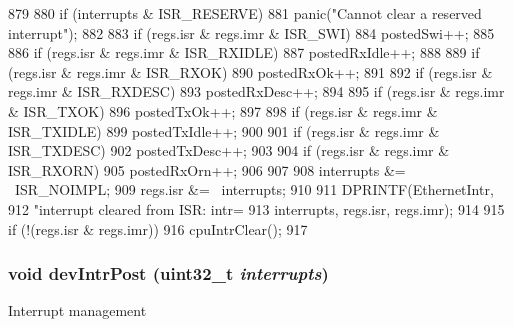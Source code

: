 \begin{DoxyCode}
879 {
880     if (interrupts & ISR_RESERVE)
881         panic("Cannot clear a reserved interrupt");
882 
883     if (regs.isr & regs.imr & ISR_SWI) {
884         postedSwi++;
885     }
886     if (regs.isr & regs.imr & ISR_RXIDLE) {
887         postedRxIdle++;
888     }
889     if (regs.isr & regs.imr & ISR_RXOK) {
890         postedRxOk++;
891     }
892     if (regs.isr & regs.imr & ISR_RXDESC) {
893             postedRxDesc++;
894     }
895     if (regs.isr & regs.imr & ISR_TXOK) {
896         postedTxOk++;
897     }
898     if (regs.isr & regs.imr & ISR_TXIDLE) {
899         postedTxIdle++;
900     }
901     if (regs.isr & regs.imr & ISR_TXDESC) {
902         postedTxDesc++;
903     }
904     if (regs.isr & regs.imr & ISR_RXORN) {
905         postedRxOrn++;
906     }
907 
908     interrupts &= ~ISR_NOIMPL;
909     regs.isr &= ~interrupts;
910 
911     DPRINTF(EthernetIntr,
912             "interrupt cleared from ISR: intr=%
913             interrupts, regs.isr, regs.imr);
914 
915     if (!(regs.isr & regs.imr))
916         cpuIntrClear();
917 }
\end{DoxyCode}
\hypertarget{classNSGigE_ad1a6ea4f31e657c02d56bdf168fb988a}{
\subsubsection[{devIntrPost}]{\setlength{\rightskip}{0pt plus 5cm}void devIntrPost ({\bf uint32\_\-t} {\em interrupts})}}
\label{classNSGigE_ad1a6ea4f31e657c02d56bdf168fb988a}
Interrupt management 


